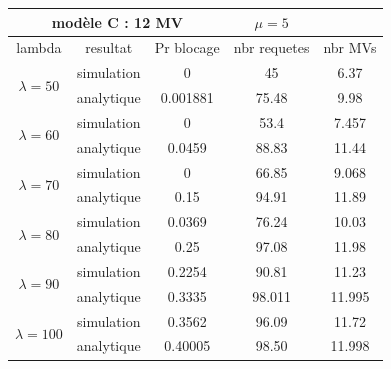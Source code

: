 \begin{tabular}{|c|c|c|c|c|}
\hline
\multicolumn{3}{|c}{modèle C : 12 MV} &\multicolumn{1}{c}{$\mu=5$}&\\
\hline 
\multicolumn{1}{|c|}{lambda}& \multicolumn{1}{c|}{resultat} & \multicolumn{1}{c|}{Pr blocage} & \multicolumn{1}{c|}{nbr requetes} & \multicolumn{1}{c|}{nbr MVs}  \\
\hline
 \multirow{2}{*}{$\lambda = 50$}& simulation & 0 & 45 & 6.37 \\ \cline{2-5}
                            & analytique & 0.001881 & 75.48 & 9.98 \\ \hline
  \multirow{2}{*}{$\lambda = 60$}  & simulation & 0 & 53.4 & 7.457 \\ \cline{2-5}
                            & analytique & 0.0459 & 88.83 & 11.44 \\ \hline
  \multirow{2}{*}{$\lambda = 70$}  & simulation & 0 & 66.85 & 9.068 \\ \cline{2-5}
                            & analytique & 0.15 & 94.91 & 11.89 \\ \hline
  \multirow{2}{*}{$\lambda = 80$} & simulation & 0.0369 & 76.24 & 10.03 \\ \cline{2-5}
                            & analytique & 0.25 & 97.08 & 11.98 \\ \hline
  \multirow{2}{*}{$\lambda = 90$} & simulation & 0.2254 & 90.81 & 11.23 \\ \cline{2-5}
                            & analytique & 0.3335 & 98.011 & 11.995 \\ \hline
  \multirow{2}{*}{$\lambda = 100$} & simulation & 0.3562 & 96.09 & 11.72 \\ \cline{2-5}
                            & analytique & 0.40005 & 98.50 & 11.998 \\ \hline
\end{tabular}  

